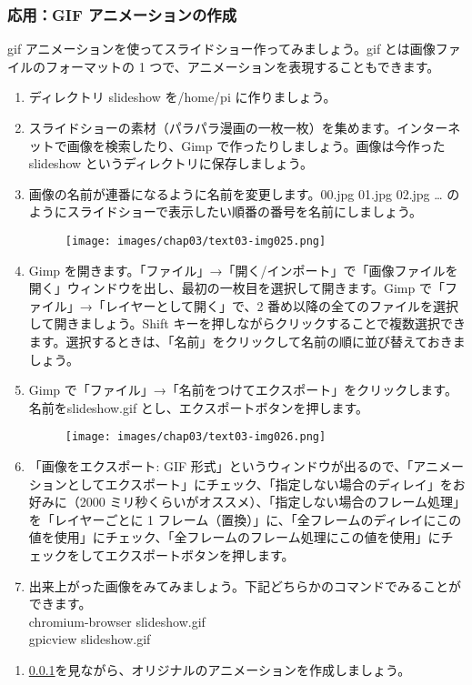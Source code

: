 \subsubsection{応用：GIF アニメーションの作成}
\label{GIF}
gif アニメーションを使ってスライドショー作ってみましょう。gif とは画像ファイルのフォーマットの 1 つで、アニメーションを表現することもできます。\\
\begin{enumerate}
\item ディレクトリ slideshow を/home/pi に作りましょう。\\
\item スライドショーの素材（パラパラ漫画の一枚一枚）を集めます。インターネットで画像を検索したり、Gimp で作ったりしましょう。画像は今作った slideshow というディレクトリに保存しましょう。\\
\item 画像の名前が連番になるように名前を変更します。00.jpg 01.jpg 02.jpg … のようにスライドショーで表示したい順番の番号を名前にしましょう。\\
\begin{figure}[H]
    \centering
    \texttt{[image: images/chap03/text03-img025.png]}
\end{figure}
\item Gimp を開きます。「ファイル」→「開く/インポート」で「画像ファイルを開く」ウィンドウを出し、最初の一枚目を選択して開きます。Gimp で「ファイル」→「レイヤーとして開く」で、2 番め以降の全てのファイルを選択して開きましょう。Shift キーを押しながらクリックすることで複数選択できます。選択するときは、「名前」をクリックして名前の順に並び替えておきましょう。\\
\item Gimp で「ファイル」→「名前をつけてエクスポート」をクリックします。名前をslideshow.gif とし、エクスポートボタンを押します。
\begin{figure}[H]
    \centering
    \texttt{[image: images/chap03/text03-img026.png]}
\end{figure}
\item 「画像をエクスポート: GIF 形式」というウィンドウが出るので、「アニメーションとしてエクスポート」にチェック、「指定しない場合のディレイ」をお好みに（2000 ミリ秒くらいがオススメ）、「指定しない場合のフレーム処理」を「レイヤーごとに 1 フレーム（置換）」に、「全フレームのディレイにこの値を使用」にチェック、「全フレームのフレーム処理にこの値を使用」にチェックをしてエクスポートボタンを押します。\\
\item 出来上がった画像をみてみましょう。下記どちらかのコマンドでみることができます。\\
chromium-browser slideshow.gif\\
gpicview slideshow.gif\\
\end{enumerate}

\begin{tcolorbox}[title=\useOmetoi]
\begin{enumerate}
\item \ref{GIF}を見ながら、オリジナルのアニメーションを作成しましょう。
\end{enumerate}
\end{tcolorbox}